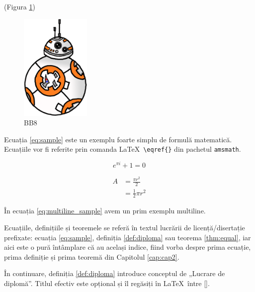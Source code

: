 \textcolor{gray}{\lipsum} (Figura \ref{fig:BB8})

\begin{figure}[H]
    \centering
    \includegraphics[width=0.3\textwidth]{continut/capitol2/figuri/BB8.png}
    \caption{BB8\protect\footnotemark}
    \label{fig:BB8}
\end{figure}

\textcolor{gray}{\lipsum}

Ecuația \eqref{eq:sample} este un exemplu foarte simplu de formulă matematică. Ecuațiile vor fi referite prin comanda \LaTeX\ \verb|\eqref{}| din pachetul \verb|amsmath|.

\begin{equation}
    \label{eq:sample}
    e^{\pi i} + 1 = 0
\end{equation}

\begin{equation}
    \label{eq:multiline_sample}
    \begin{split}
        A & = \frac{\pi r^2}{2} \\
         & = \frac{1}{2} \pi r^2
    \end{split}
\end{equation}

În ecuația \eqref{eq:multiline_sample} avem un prim exemplu multiline.

Ecuațiile, definițiile și teoremele se referă în textul lucrării de licență/disertație prefixate: ecuația \eqref{eq:sample}, definiția \ref{def:diploma} sau teorema \ref{thm:equal}, iar aici este o pură întâmplare că au același indice, fiind vorba despre prima ecuație, prima definiție și prima teoremă din Capitolul \ref{cap:cap2}.

În continuare, definiția \ref{def:diploma} introduce conceptul de „Lucrare de diplomă”. Titlul efectiv este opțional și îl regăsiți în \LaTeX\ între [].

